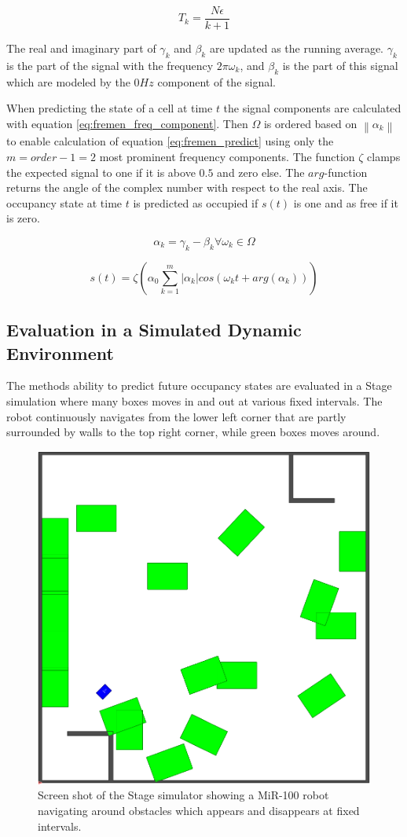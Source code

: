 \begin{equation}
T_k = \frac{N \epsilon}{k+1}
\label{eq:fremen_time}
\end{equation}

The real and imaginary part of $\gamma_k$ and $\beta_k$ are updated as the running average. $\gamma_k$ is the part of the signal with the frequency $2 \pi \omega_k$, and $\beta_k$ is the part of this signal which are modeled by the $0Hz$ component of the signal.

When predicting the state of a cell at time $t$ the signal components are calculated with equation \ref{eq:fremen_freq_component}.
Then $ \Omega $ is ordered based on $ \left\| \alpha_k \right\| $ to enable calculation of equation \ref{eq:fremen_predict} using only the $m=order-1=2$ most prominent frequency components.
The function $\zeta$ clamps the expected signal to one if it is above $0.5$ and zero else. The $arg$-function returns the angle of the complex number with respect to the real axis.
The occupancy state at time $t$ is predicted as occupied if $s(t)$ is one and as free if it is zero.

\begin{equation}
\alpha_k = \gamma_k - \beta_k \forall \omega_k \in \Omega
\label{eq:fremen_freq_component}
\end{equation}

\begin{equation}
s(t) = \zeta \left( \alpha_0 \sum_{k=1}^{m} |\alpha_k| cos(\omega_k t + arg(\alpha_k))  \right)
\label{eq:fremen_predict}
\end{equation}

\subsection{Evaluation in a Simulated Dynamic Environment}
\label{sec:fremen_sim_eval}
The methods ability to predict future occupancy states are evaluated in a Stage simulation \cite{Vaughan2008} where many boxes moves in and out at various fixed intervals. 
The robot continuously navigates from the lower left corner that are partly surrounded by walls to the top right corner, while green boxes moves around.

\begin{figure}[htbp]
    \centering
    \includegraphics[width=0.4\linewidth]{chapters/mapping_of_dynamic_areas/figures/simulated_environment}
    \caption{Screen shot of the Stage simulator showing a MiR-100 robot navigating around obstacles which appears and disappears at fixed intervals.}
    \label{fig:simulated_environment}
\end{figure}

